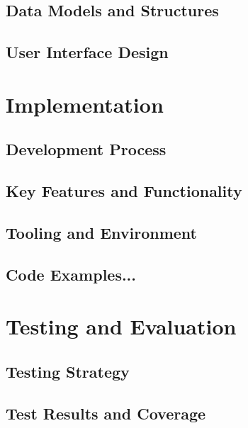 \documentclass[conference, onecolumn]{IEEEtran}
\begin{document}
  \subsection{Data Models and Structures}
  \label{subsec:data-models}

  \subsection{User Interface Design}
  \label{subsec:user-interface-design}




  \section{Implementation}
  \label{subsec:implementation}

  \subsection{Development Process}
  \label{subsec:development-process}

  \subsection{Key Features and Functionality}
  \label{subsec:key-features}

  \subsection{Tooling and Environment}
  \label{subsec:tooling}

  \subsection{Code Examples...}
  \label{subsec:code-examples}

  \section{Testing and Evaluation}
  \label{sec:testing}

  \subsection{Testing Strategy}
  \label{subsec:testing-strategy}

  \subsection{Test Results and Coverage}
  \label{subsec:test-results}
\end{document}
